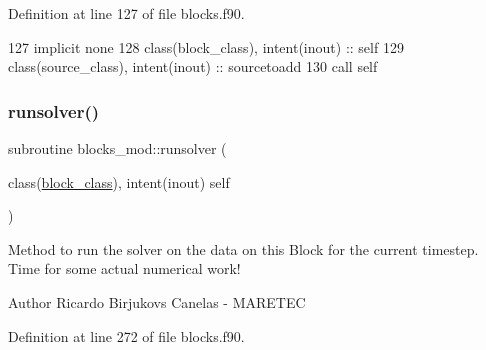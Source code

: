 Definition at line 127 of file blocks.\+f90.


\begin{DoxyCode}
127     \textcolor{keywordtype}{implicit none}
128     \textcolor{keywordtype}{class}(block\_class), \textcolor{keywordtype}{intent(inout)} :: self
129     \textcolor{keywordtype}{class}(source\_class), \textcolor{keywordtype}{intent(inout)} :: sourcetoadd
130     \textcolor{keyword}{call }self%
\end{DoxyCode}
\mbox{\label{namespaceblocks__mod_a3245bdadbec6bb123c517921d1503b48}} 
\subsubsection{\texorpdfstring{runsolver()}{runsolver()}}
{\footnotesize\ttfamily subroutine blocks\+\_\+mod\+::runsolver (\begin{DoxyParamCaption}\item[{class(\mbox{\hyperlink{structblocks__mod_1_1block__class}{block\+\_\+class}}), intent(inout)}]{self }\end{DoxyParamCaption})\hspace{0.3cm}{\ttfamily [private]}}



Method to run the solver on the data on this Block for the current timestep. Time for some actual numerical work! 

\begin{DoxyAuthor}{Author}
Ricardo Birjukovs Canelas -\/ M\+A\+R\+E\+T\+EC 
\end{DoxyAuthor}


Definition at line 272 of file blocks.\+f90.


\mbox{\label{namespaceblocks__mod_a5a9992de40470e417ec8e40e688f6a0e}} 
